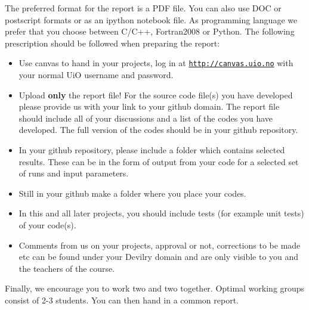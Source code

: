 \documentclass[%
oneside,                 %
final,                   %
10pt]{article}
\begin{document}
The preferred format for the report is a PDF file. You can also use DOC or postscript formats or as an ipython notebook file.  As programming language we prefer that you choose between C/C++, Fortran2008 or Python. The following prescription should be followed when preparing the report:

\begin{itemize}
  \item Use canvas to hand in your projects, log in  at  \href{{http://canvas.uio.no}}{\nolinkurl{http://canvas.uio.no}} with your normal UiO username and password.

  \item Upload \textbf{only} the report file!  For the source code file(s) you have developed please provide us with your link to your github domain.  The report file should include all of your discussions and a list of the codes you have developed.  The full version of the codes should be in your github repository.

  \item In your github repository, please include a folder which contains selected results. These can be in the form of output from your code for a selected set of runs and input parameters.

  \item Still in your github make a folder where you place your codes.

  \item In this and all later projects, you should include tests (for example unit tests) of your code(s).

  \item Comments  from us on your projects, approval or not, corrections to be made  etc can be found under your Devilry domain and are only visible to you and the teachers of the course.
\end{itemize}

\noindent
Finally,
we encourage you to work two and two together. Optimal working groups consist of
2-3 students. You can then hand in a common report.

\end{document}
